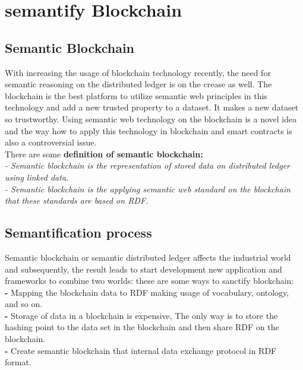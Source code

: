 \section{semantify Blockchain}
\subsection{Semantic Blockchain}
With increasing the usage of blockchain technology recently, the need for semantic reasoning on the distributed ledger is on the crease as well. The blockchain is the best platform to utilize semantic web principles in this technology and add a new trusted property to a dataset. It makes a new dataset so trustworthy. 
Using semantic web technology on the blockchain is a novel idea and the way how to apply this technology in blockchain and smart contracts is also a controversial issue.\\
There are some \textbf{definition of semantic blockchain:}\\ 
\textit{- Semantic blockchain is the representation of stored data on distributed ledger using linked data. }\\
\textit{- Semantic blockchain is the applying semantic web standard on the blockchain that these standards are based on RDF.}

\subsection{Semantification process}
Semantic blockchain or semantic distributed ledger affects the industrial world and subsequently, the result leads to start development new application and frameworks to combine two worlds:
these are some ways to sanctify blockchain:\\
\textbf{-} Mapping the blockchain data to RDF making usage of vocabulary, ontology, and so on.\\
\textbf{-} Storage of data in a blockchain is expensive, The only way is to store the hashing point to the data set in the blockchain and then share RDF on the blockchain. \\
\textbf{-} Create semantic blockchain that internal data exchange protocol in RDF format\cite{Hector}. \\

